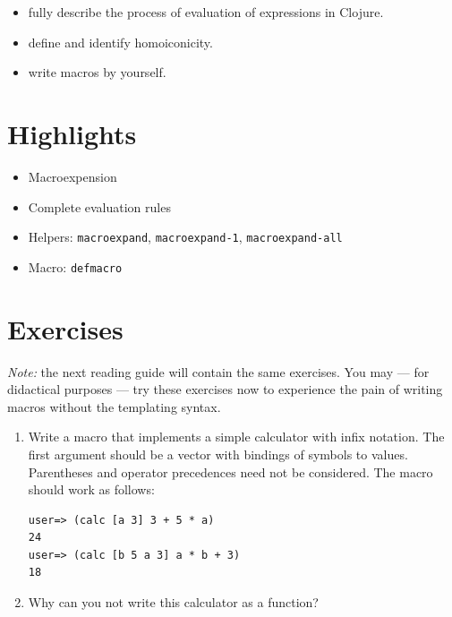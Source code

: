 \documentclass[11pt,a4paper]{article}
\begin{document}
\begin{itemize}
	\item fully describe the process of evaluation of expressions in Clojure.
    \item define and identify homoiconicity.
    \item write macros by yourself.
\end{itemize}

\section{Highlights}

\begin{itemize}
    \item Macroexpension
    \item Complete evaluation rules
    \item Helpers: \verb|macroexpand|, \verb|macroexpand-1|, \verb|macroexpand-all|
    \item Macro: \verb|defmacro|
\end{itemize}



\section{Exercises}

\emph{Note:} the next reading guide will contain the same exercises.
You may --- for didactical purposes --- try these exercises now 
to experience the pain of writing macros
without the templating syntax.

\begin{exercise}[Macro]
\begin{enumerate}[label=\alph*)]
\item
Write a macro that implements a simple calculator with infix notation. The first argument should be a vector with bindings of symbols to values. Parentheses and operator precedences need not be considered. The macro should work as follows:
\begin{verbatim}
user=> (calc [a 3] 3 + 5 * a)
24
user=> (calc [b 5 a 3] a * b + 3)
18
\end{verbatim}
\item Why can you not write this calculator as a function?
\end{enumerate}
\end{exercise}
\end{document}
